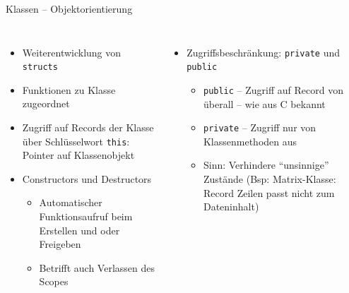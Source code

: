 \begin{frame}{Klassen -- Objektorientierung}
%
\begin{columns}[T]
\begin{itemize}
\item Weiterentwicklung von \texttt{structs}
\item Funktionen zu Klasse zugeordnet
\item Zugriff auf Records der Klasse über Schlüsselwort \texttt{this}: Pointer auf Klassenobjekt
\item Constructors und Destructors
	\begin{itemize}
	\item Automatischer Funktionsaufruf beim Erstellen und oder Freigeben
	\item Betrifft auch Verlassen des Scopes
	\end{itemize}
\end{itemize}
%
\begin{itemize}
\item Zugriffsbeschränkung: \texttt{private} und \texttt{public}
	\begin{itemize}
	\item \texttt{public} -- Zugriff auf Record von überall -- wie aus C bekannt
	\item \texttt{private} -- Zugriff nur von Klassenmethoden aus
	\item Sinn: Verhindere \enquote{unsinnige} Zustände (Bsp: Matrix-Klasse: Record Zeilen passt nicht 
		zum  Dateninhalt)
	\end{itemize}
\end{itemize}
\end{columns}
%
\end{frame}



